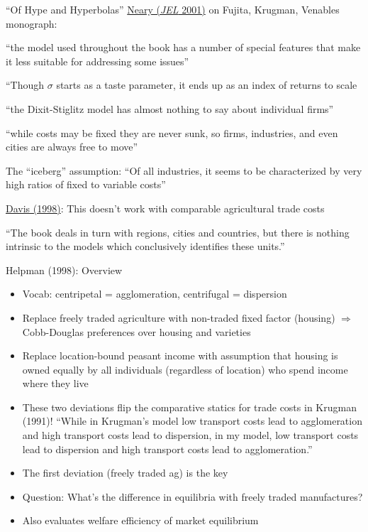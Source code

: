 \documentclass[11pt,notes=hide,aspectratio=169]{beamer}
\begin{document}
\begin{frame}{``Of Hype and Hyperbolas''}
\href{https://www.aeaweb.org/articles?id=10.1257/jel.39.2.536}{Neary (\textit{JEL} 2001)} on Fujita, Krugman, Venables monograph:
\begin{itemize}
{\small
\item ``the model used throughout the book has a number of special features that make it less suitable for addressing some issues''
\item ``Though $\sigma$ starts as a taste parameter, it ends up as an index of returns to scale
\item ``the Dixit-Stiglitz model has almost nothing to say about individual firms''
\item ``while costs may be fixed they are never sunk, so firms, industries, and even cities are always free to move''
\item The ``iceberg'' assumption: ``Of all industries, it seems to be characterized by very high ratios of fixed to variable costs''
\item \href{https://www.jstor.org/stable/116870}{Davis (1998)}: This doesn't work with comparable agricultural trade costs
\item ``The book deals in turn with regions, cities and countries, but there is nothing intrinsic to the models which conclusively identifies these units.''
}
\end{itemize}
\end{frame}
\begin{frame}{Helpman (1998): Overview}
\begin{itemize}
	\item Vocab: centripetal = agglomeration, centrifugal  = dispersion
	\item Replace freely traded agriculture with non-traded fixed factor (housing) $\Rightarrow$ Cobb-Douglas preferences over housing and varieties
	\item Replace location-bound peasant income with assumption that housing is owned equally by all individuals (regardless of location) who spend income where they live
	\item These two deviations flip the comparative statics for trade costs in Krugman (1991)! ``While in Krugman's model low transport costs lead to agglomeration and high transport costs lead to dispersion, in my model, low transport costs lead to dispersion and high transport costs lead to agglomeration.''
	\item The first deviation (freely traded ag) is the key
	\item Question: What's the difference in equilibria with freely traded manufactures?
	\item Also evaluates welfare efficiency of market equilibrium
\end{itemize}
\end{frame}
\end{document}
